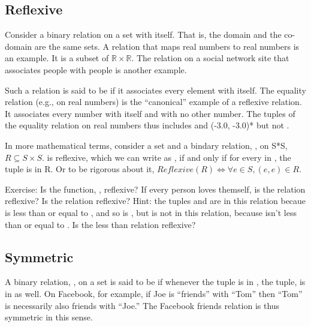 \documentclass[letterpaper,10pt,english]{sphinxmanual}
\begin{document}
\subsection{Reflexive}
\label{\detokenize{08-relations:reflexive}}
Consider a binary relation on a set with itself.  That is, the domain
and the co-domain are the same sets. A relation that maps real numbers
to real numbers is an example. It is a subset of \({\mathbb R}
\times {\mathbb R}\). The  relation on a social network site
that associates people with people is another example.

Such a relation is said to be  if it associates every
element with itself.  The equality relation (e.g., on real numbers) is
the “canonical” example of a reflexive relation. It associates every
number with itself and with no other number. The tuples of the
equality relation on real numbers thus includes  and
(-3.0, -3.0)* but not .

In more mathematical terms, consider a set  and a bindary relation,
, on S*S, \(R \subseteq S \times S.\)  is reflexive, which
we can write as , if and only if for every  in ,
the tuple  is in R. Or to be rigorous about it,
\(Reflexive(R) \iff \forall e \in S, (e,e) \in R.\)

Exercise: Is the function, , reflexive? If every person loves
themself, is the  relation reflexive? Is the  relation reflexive? Hint: the tuples  and  are
in this relation becaue  is less than or equal to , and so is
, but  is not in this relation, because  isn’t less than
or equal to . Is the less than relation reflexive?


\subsection{Symmetric}
\label{\detokenize{08-relations:symmetric}}
A binary relation, , on a set  is said to be  if
whenever the tuple  is in , the tuple,  is in  as
well. On Facebook, for example, if Joe is “friends” with “Tom” then
“Tom” is necessarily also friends with “Joe.” The Facebook friends
relation is thus symmetric in this sense.
\end{document}
